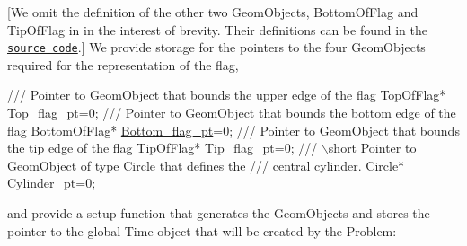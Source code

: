 \mbox{[}We omit the definition of the other two {\ttfamily Geom\+Objects}, {\ttfamily Bottom\+Of\+Flag} and {\ttfamily Tip\+Of\+Flag} in in the interest of brevity. Their definitions can be found in the \href{
../../../../demo_drivers/navier_stokes/turek_flag_non_fsi/turek_flag_non_fsi.cc
}{\tt source code}.\mbox{]} We provide storage for the pointers to the four {\ttfamily Geom\+Objects} required for the representation of the flag,


\begin{DoxyCodeInclude}
 \textcolor{comment}{/// Pointer to GeomObject that bounds the upper edge of the flag}
 TopOfFlag* \hyperlink{namespaceFlag__definition_af602ebeb0c40d05d00961af07bf3e842}{Top\_flag\_pt}=0;
\textcolor{comment}{}
\textcolor{comment}{ /// Pointer to GeomObject that bounds the bottom edge of the flag}
\textcolor{comment}{} BottomOfFlag* \hyperlink{namespaceFlag__definition_adde5e58da47e90ef46e1183188281f2e}{Bottom\_flag\_pt}=0;
\textcolor{comment}{}
\textcolor{comment}{ /// Pointer to GeomObject that bounds the tip edge of the flag}
\textcolor{comment}{} TipOfFlag* \hyperlink{namespaceFlag__definition_a17de6efd8447ee9c2bb5a1767084ecef}{Tip\_flag\_pt}=0;
\textcolor{comment}{}
\textcolor{comment}{ /// \(\backslash\)short Pointer to GeomObject of type Circle that defines the}
\textcolor{comment}{ /// central cylinder.}
\textcolor{comment}{} Circle* \hyperlink{namespaceFlag__definition_a87051411606f6aa4518ace9ce66a4189}{Cylinder\_pt}=0;

\end{DoxyCodeInclude}


and provide a setup function that generates the {\ttfamily Geom\+Objects} and stores the pointer to the global {\ttfamily Time} object that will be created by the {\ttfamily Problem\+:} 


